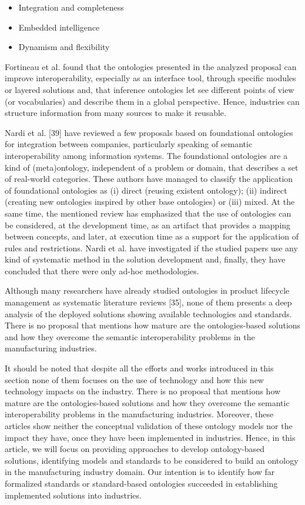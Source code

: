 \documentclass[peerreview]{IEEEtran}
\begin{document}
\begin{itemize}
\item Integration and completeness
\item Embedded intelligence
\item Dynamism and flexibility
\end{itemize}

Fortineau et al. found that the ontologies presented in the analyzed proposal can improve interoperability, especially as an interface tool, through specific modules or layered solutions and, that inference ontologies let see different points of view (or vocabularies) and describe them in a global perspective. Hence, industries can structure information from many sources to make it reusable. 


Nardi et al. [39] have reviewed a few proposals based on foundational ontologies for integration between companies, particularly speaking of semantic interoperability among information systems. The foundational ontologies are a kind of (meta)ontology, independent of a problem or domain, that describes a set of real-world categories. These authors have managed to classify the application of foundational ontologies as (i) direct (reusing existent ontology); (ii) indirect (creating new ontologies inspired by other base ontologies) or (iii) mixed. At the same time, the mentioned review has emphasized that the use of ontologies can be considered, at the development time, as an artifact that provides a mapping between concepts, and later, at execution time as a support for the application of rules and restrictions. Nardi et al. have investigated if the studied papers use any kind of systematic method in the solution development and, finally, they have concluded that there were only ad-hoc methodologies.



Although many researchers have already studied ontologies in product lifecycle management as systematic literature reviews [35], none of them presents a deep analysis of the deployed solutions showing available technologies and standards. There is no proposal that mentions how mature are the ontologies-based solutions and how they overcome the semantic interoperability problems in the manufacturing industries. 


It should be noted that despite all the efforts and works introduced in this section none of them focuses on the use of technology and how this new technology impacts on the industry. There is no proposal that mentions how mature are the ontologies-based solutions and how they overcome the semantic interoperability problems in the manufacturing industries. Moreover, these articles show neither the conceptual validation of these ontology models nor the impact they have, once they have been implemented in industries. Hence, in this article, we will focus on providing approaches to develop ontology-based solutions, identifying models and standards to be considered to build an ontology in the manufacturing industry domain. Our intention is to identify how far formalized standards or standard-based ontologies succeeded in establishing implemented solutions into industries.
\end{document}
